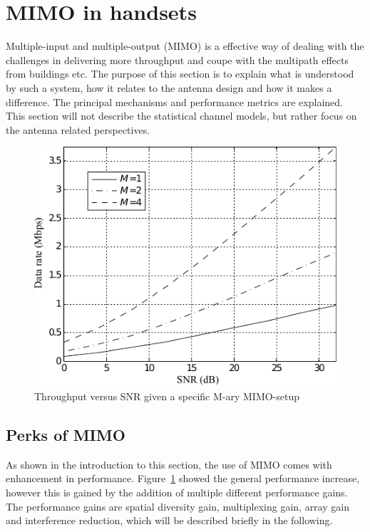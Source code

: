 \section{MIMO in handsets} %
\label{sec:mimo_in_handsets}
Multiple-input and multiple-output (MIMO) is a effective way of dealing with the challenges in delivering more throughput and coupe with the multipath effects from buildings etc. The purpose of this section is to explain what is understood by such a system, how it relates to the antenna design and how it makes a difference. The principal mechanisms and performance metrics are explained. This section will not describe the statistical channel models, but rather focus on the antenna related perspectives. 

\begin{figure}[htbp]
  \centering
  \includegraphics[scale=1.2]{img/analysis/datarateMimo}
  \caption{Throughput versus SNR given a specific M-ary MIMO-setup\cite{Ezio2007MIMO}}
  \label{fig:mimo-throughput}
\end{figure}

\subsection{Perks of MIMO} 
As shown in the introduction to this section, the use of MIMO comes with enhancement in performance. Figure~\ref{fig:mimo-throughput} showed the general performance increase, however this is gained by the addition of multiple different performance gains. The performance gains are spatial diversity gain, multiplexing gain, array gain and interference reduction\cite{Ezio2007MIMO}, which will be described briefly in the following.

